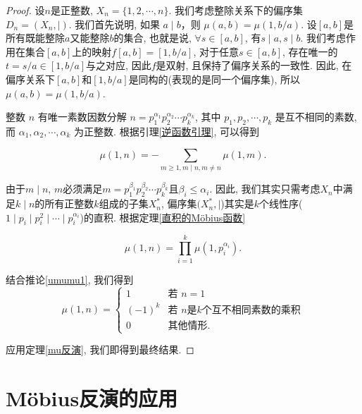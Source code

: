 \begin{proof}
    设\(n\)是正整数, \(X_n=\{1,2,\cdots,n\}\). 我们考虑整除关系下的偏序集\(D_n=(X_n, \mid )\). 我们首先说明, 如果 \( a \mid b \)，则 \( \mu(a, b) = \mu\left(1, b/a\right) \). 设\([a,b]\)是所有既能整除\(a\)又能整除\(b\)的集合, 也就是说, \(\forall s\in [a,b]\), 有\(s\mid a, s\mid b\). 我们考虑作用在集合\([a,b]\)上的映射\(f[a,b]=[1,b/a]\), 对于任意\(s\in [a,b]\), 存在唯一的\(t=s/a\in [1,b/a]\)与之对应, 因此\(f\)是双射, 且保持了偏序关系的一致性. 因此, 在偏序关系下\([a,b]\)和\([1,b/a]\)是同构的(表现的是同一个偏序集), 所以\( \mu(a, b) = \mu\left(1, b/a\right) \).

    整数 $n$ 有唯一素数因数分解
    \(n = p_1^{\alpha_1} p_2^{\alpha_2} \cdots p_k^{\alpha_k} \),
    其中 $p_1, p_2, \cdots, p_k$ 是互不相同的素数, 而 $\alpha_1, \alpha_2, \cdots, \alpha_k$ 为正整数. 根据引理\ref{逆函数引理}, 可以得到

    \[\mu(1, n) = -\sum_{m \geq 1, m \mid n, m \neq n} \mu(1, m).\]

    由于\(m\mid n\), \(m\)必须满足\(m=p_1^{\beta_1} p_2^{\beta_2} \cdots p_k^{\beta_k}\)且\(\beta_i\leq\alpha_i\). 因此, 我们其实只需考虑\(X_n\)中满足\(k\mid n\)的所有正整数\(k\)组成的子集\(X^*_n\), 偏序集\((X^*_n, \mid \))其实是\(k\)个线性序($1\mid p_i\mid p_i^2\mid\cdots\mid p_{i}^{\alpha_i}$)的直积. 根据定理\ref{直积的Möbius函数}

    \[\mu(1, n) = \prod_{i=1}^{k} \mu(1, p_i^{\alpha_i}).\]

    结合推论\ref{umumu1}, 我们得到\[\mu(1, n) = 
\begin{cases} 
1 & \text{若 } n = 1 \\ 
(-1)^k & \text{若 } n \text{是}k\text{个互不相同素数的乘积} \\
0 & \text{其他情形.}
\end{cases}\]

应用定理\ref{mu反演}, 我们即得到最终结果.
\end{proof}

\section{Möbius反演的应用} 